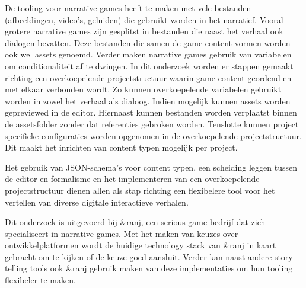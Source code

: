 De tooling voor narrative games heeft te maken met vele bestanden (afbeeldingen, video’s, geluiden) die gebruikt worden in het narratief. Vooral grotere narrative games zijn gesplitst in bestanden die naast het verhaal ook dialogen bevatten. Deze bestanden die samen de game content vormen worden ook wel assets genoemd. Verder maken narrative games gebruik van variabelen om conditionaliteit af te dwingen. In dit onderzoek worden er stappen gemaakt richting een overkoepelende projectstructuur waarin game content geordend en met elkaar verbonden wordt. Zo kunnen overkoepelende variabelen gebruikt worden in zowel het verhaal als dialoog. Indien mogelijk kunnen assets worden gepreviewed in de editor. Hiernaast kunnen bestanden worden verplaatst binnen de assetsfolder zonder dat referenties gebroken worden. Tenslotte kunnen project specifieke configuraties worden opgenomen in de overkoepelende projectstructuur. Dit maakt het inrichten van content typen mogelijk per project.

Het gebruik van JSON-schema’s voor content typen, een scheiding leggen tussen de editor en formalisme en het implementeren van een overkoepelende projectstructuur dienen allen als stap richting een flexibelere tool voor het vertellen van diverse digitale interactieve verhalen.

Dit onderzoek is uitgevoerd bij \&ranj, een serious game bedrijf dat zich specialiseert in narrative games. Met het maken van keuzes over ontwikkelplatformen wordt de huidige technology stack van \&ranj in kaart gebracht om te kijken of de keuze goed aansluit. Verder kan naast andere story telling tools ook \&ranj gebruik maken van deze implementaties om hun tooling flexibeler te maken.